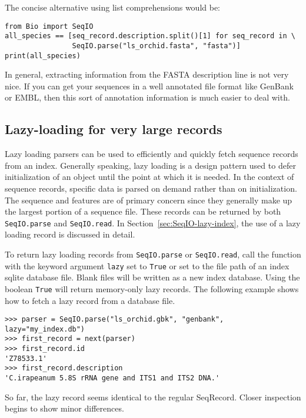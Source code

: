 \documentclass{report}
\begin{document}
The concise alternative using list comprehensions would be:

\begin{verbatim}
from Bio import SeqIO
all_species == [seq_record.description.split()[1] for seq_record in \
                SeqIO.parse("ls_orchid.fasta", "fasta")]
print(all_species)
\end{verbatim}

In general, extracting information from the FASTA description line is not very nice.
If you can get your sequences in a well annotated file format like GenBank or EMBL,
then this sort of annotation information is much easier to deal with.

\subsection{Lazy-loading for very large records}
\label{sec:SeqIO-parse-with-lazy}

Lazy loading parsers can be used to efficiently and quickly fetch sequence
records from an index. Generally speaking, lazy loading is a design pattern
used to defer initialization of an object until the point at which it is
needed. In the context of sequence records, specific data is parsed on demand
rather than on initialization. The sequence and features are of primary concern
since they generally make up the largest portion of a sequence file. These
records can be returned by both \verb|SeqIO.parse| and \verb|SeqIO.read|. In
Section~\ref{sec:SeqIO-lazy-index}, the use of a lazy loading record is
discussed in detail.

To return lazy loading records from \verb|SeqIO.parse| or
\verb|SeqIO.read|, call the function with the keyword argument \verb|lazy|
set to \verb|True| or set to the file path of an index sqlite database
file. Blank files will be written as a new index database. Using the
boolean \verb|True| will return memory-only lazy records. The following
example shows how to fetch a lazy record from a database file.

\begin{verbatim}
>>> parser = SeqIO.parse("ls_orchid.gbk", "genbank", lazy="my_index.db")
>>> first_record = next(parser)
>>> first_record.id
'Z78533.1'
>>> first_record.description
'C.irapeanum 5.8S rRNA gene and ITS1 and ITS2 DNA.'
\end{verbatim}

So far, the lazy record seems identical to the regular SeqRecord. Closer
inspection begins to show minor differences.
\end{document}

